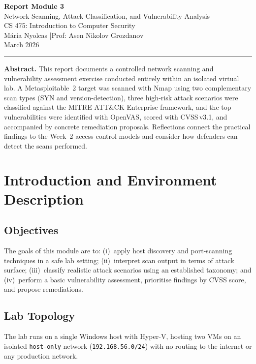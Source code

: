 \documentclass[11pt,a4paper]{article}
\begin{document}

\begin{center}
  {\Large\bfseries Report Module 3}\\[4pt]
  {\large Network Scanning, Attack Classification, and Vulnerability Analysis}\\[6pt]
  {\normalsize CS 475: Introduction to Computer Security}\\[2pt]
  {\normalsize Mária Nyolcas \quad|\quad Prof: Asen Nikolov Grozdanov}\\[2pt]
  {\normalsize March 2026}
\end{center}

\vspace{4pt}
\noindent\rule{\linewidth}{0.6pt}
\vspace{2pt}

\noindent\textbf{Abstract.}
This report documents a controlled network scanning and vulnerability assessment exercise
conducted entirely within an isolated virtual lab.  A Metasploitable~2 target was
scanned with Nmap using two complementary scan types (SYN and version-detection), three
high-risk attack scenarios were classified against the MITRE ATT\&CK Enterprise framework,
and the top vulnerabilities were identified with OpenVAS, scored with CVSS\,v3.1, and
accompanied by concrete remediation proposals.  Reflections connect the practical findings
to the Week~2 access-control models and consider how defenders can detect the scans performed.


\section{Introduction and Environment Description}

\subsection{Objectives}
The goals of this module are to: (i)~apply host discovery and port-scanning techniques in
a safe lab setting; (ii)~interpret scan output in terms of attack surface; (iii)~classify
realistic attack scenarios using an established taxonomy; and (iv)~perform a basic
vulnerability assessment, prioritise findings by CVSS score, and propose remediations.

\subsection{Lab Topology}
The lab runs on a single Windows host with Hyper-V, hosting two VMs on an isolated
\texttt{host-only} network (\texttt{192.168.56.0/24}) with no routing to the internet
or any production network.
\end{document}
